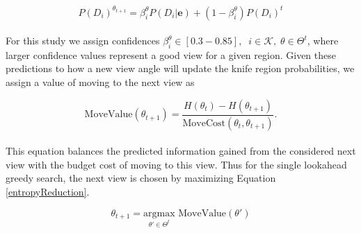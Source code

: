 \documentclass[letterpaper, 10 pt, conference]{ieeeconf}  %
\begin{document}
\begin{equation}
    P(D_i)^{\theta_{t+1}} = \beta_i^{\theta} P(D_i|\mathbf{e}) + (1 - \beta_i^{\theta}) P(D_i)^{t} \label{confidenceValueUpdate}
\end{equation}
\\

For this study we assign confidences $\beta_i^{\theta} \in [0.3 - 0.85], \;\;i\in\mathcal{K},\;\theta\in\Theta^t$, where larger confidence values represent a good view for a given region. Given these predictions to how a new view angle will update the knife region probabilities, we assign a value of moving to the next view as

\begin{equation}
    \text{MoveValue}(\theta_{t+1}) = \frac{H(\theta_t) - H(\theta_{t+1})}{\text{MoveCost}(\theta_t,\theta_{t+1})}. \label{entropyReduction}
\end{equation}
\\

 This equation balances the predicted information gained from the considered next view with the budget cost of moving to this view. Thus for the single lookahead greedy search, the next view is chosen by maximizing Equation \eqref{entropyReduction}.

\begin{equation}
    \theta_{t+1} = \underset{\theta'\in\Theta^t}{\text{argmax}}\text{ MoveValue}(\theta')
\end{equation}
\\
\end{document}
